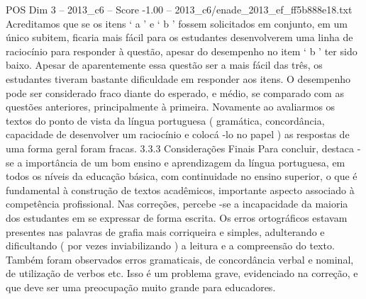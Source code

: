 \begin{textsample}{POS Dim 3 – 2013\_c6 – Score -1.00 – 2013\_c6/enade\_2013\_ef\_ff5b888e18.txt}
Acreditamos que se os itens ‘ a ’ e ‘ b ’ fossem solicitados em conjunto, em um único subitem, ficaria mais fácil para os estudantes desenvolverem uma linha de raciocínio para responder à questão, apesar do desempenho no item ‘ b ’ ter sido baixo.
Apesar de aparentemente essa questão ser a mais fácil das três, os estudantes tiveram bastante dificuldade em responder aos itens.
O desempenho pode ser considerado fraco diante do esperado, e médio, se comparado com as questões anteriores, principalmente à primeira.
Novamente ao avaliarmos os textos do ponto de vista da língua portuguesa ( gramática, concordância, capacidade de desenvolver um raciocínio e colocá -lo no papel ) as respostas de uma forma geral foram fracas. 3.3.3 Considerações Finais Para concluir, destaca -se a importância de um bom ensino e aprendizagem da língua portuguesa, em todos os níveis da educação básica, com continuidade no ensino superior, o que é fundamental à construção de textos acadêmicos, importante aspecto associado à competência profissional.
Nas correções, percebe -se a incapacidade da maioria dos estudantes em se expressar de forma escrita.
Os erros ortográficos estavam presentes nas palavras de grafia mais corriqueira e simples, adulterando e dificultando ( por vezes inviabilizando ) a leitura e a compreensão do texto.
Também foram observados erros gramaticais, de concordância verbal e nominal, de utilização de verbos etc.
Isso é um problema grave, evidenciado na correção, e que deve ser uma preocupação muito grande para educadores.

\end{textsample}
